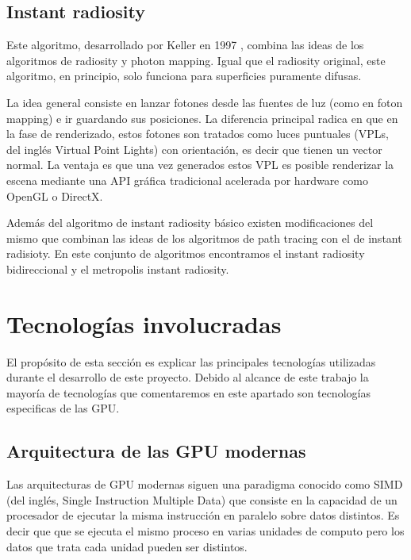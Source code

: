 \subsection{Instant radiosity}

Este algoritmo, desarrollado por Keller en 1997 \nocite{Keller1997}, combina las ideas de los algoritmos de radiosity y photon mapping. Igual que el radiosity original, este algoritmo, en principio, solo funciona para superficies puramente difusas.

\medskip
La idea general consiste en lanzar fotones desde las fuentes de luz (como en foton mapping) e ir guardando sus posiciones. La diferencia principal radica en que en la fase de renderizado, estos fotones son tratados como luces puntuales (VPLs, del inglés Virtual Point Lights) con orientación, es decir que tienen un vector normal. La ventaja es que una vez generados estos VPL es posible renderizar la escena mediante una API gráfica tradicional acelerada por hardware como OpenGL o DirectX.

\medskip

Además del algoritmo de instant radiosity básico existen modificaciones del mismo que combinan las ideas de los algoritmos de path tracing con el de instant radisioty. En este conjunto de algoritmos encontramos el instant radiosity bidireccional y el metropolis instant radiosity.  


\clearpage

\section{Tecnologías involucradas}

El propósito de esta sección es explicar las principales tecnologías utilizadas durante el desarrollo de este proyecto. Debido al alcance de este trabajo la mayoría de tecnologías que comentaremos en este apartado son tecnologías especificas de las GPU.

\subsection{Arquitectura de las GPU modernas}

Las arquitecturas de GPU modernas siguen una paradigma conocido como SIMD (del inglés, Single Instruction Multiple Data) que consiste en la capacidad de un procesador de ejecutar la misma instrucción en paralelo sobre datos distintos. Es decir que que se ejecuta el mismo proceso en varias unidades de computo pero los datos que trata cada unidad pueden ser distintos.

